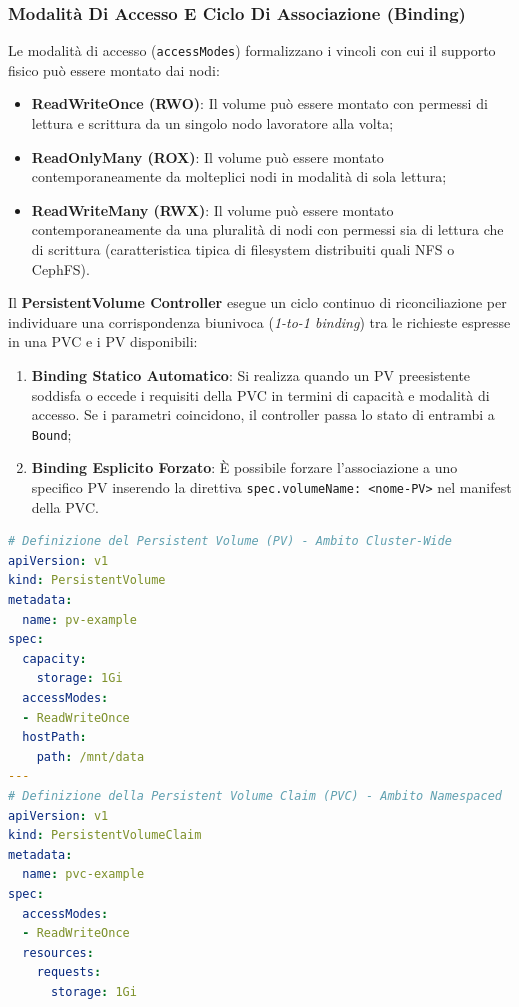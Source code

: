 \documentclass[11pt, a4paper]{article}
\begin{document}
\subsubsection{Modalità Di Accesso E Ciclo Di Associazione (Binding)}
Le modalità di accesso (\texttt{accessModes}) formalizzano i vincoli con cui il supporto fisico può essere montato dai nodi:
\begin{itemize}[noitemsep]
    \item \textbf{ReadWriteOnce (RWO)}: Il volume può essere montato con permessi di lettura e scrittura da un singolo nodo lavoratore alla volta;
    \item \textbf{ReadOnlyMany (ROX)}: Il volume può essere montato contemporaneamente da molteplici nodi in modalità di sola lettura;
    \item \textbf{ReadWriteMany (RWX)}: Il volume può essere montato contemporaneamente da una pluralità di nodi con permessi sia di lettura che di scrittura (caratteristica tipica di filesystem distribuiti quali NFS o CephFS).
\end{itemize}

Il \textbf{PersistentVolume Controller} esegue un ciclo continuo di riconciliazione per individuare una corrispondenza biunivoca (\emph{1-to-1 binding}) tra le richieste espresse in una PVC e i PV disponibili:
\begin{enumerate}[noitemsep]
    \item \textbf{Binding Statico Automatico}: Si realizza quando un PV preesistente soddisfa o eccede i requisiti della PVC in termini di capacità e modalità di accesso. Se i parametri coincidono, il controller passa lo stato di entrambi a \texttt{Bound};
    \item \textbf{Binding Esplicito Forzato}: È possibile forzare l'associazione a uno specifico PV inserendo la direttiva \texttt{spec.volumeName: <nome-PV>} nel manifest della PVC.
\end{enumerate}

\begin{lstlisting}[language=yaml, caption={Esempio di manifest per un PersistentVolume e una corrispondente PersistentVolumeClaim.}]
# Definizione del Persistent Volume (PV) - Ambito Cluster-Wide
apiVersion: v1
kind: PersistentVolume
metadata:
  name: pv-example
spec:
  capacity:
    storage: 1Gi
  accessModes:
  - ReadWriteOnce
  hostPath:
    path: /mnt/data
---
# Definizione della Persistent Volume Claim (PVC) - Ambito Namespaced
apiVersion: v1
kind: PersistentVolumeClaim
metadata:
  name: pvc-example
spec:
  accessModes:
  - ReadWriteOnce
  resources:
    requests:
      storage: 1Gi
\end{lstlisting}
\end{document}
